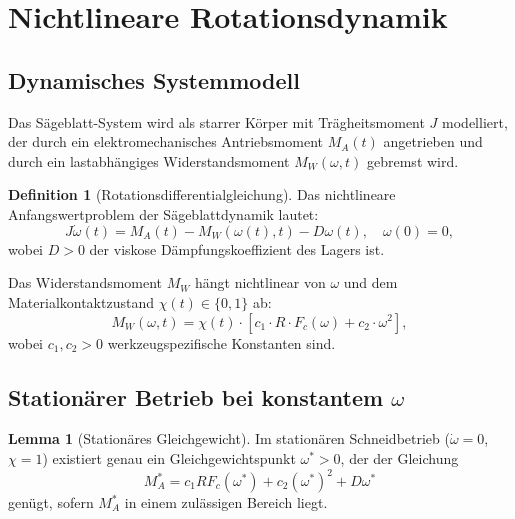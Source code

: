 ﻿\documentclass[a4paper,12pt]{article}
\theoremstyle{definition}
\newtheorem{definition}{Definition}
\newtheorem{lemma}{Lemma}
\begin{document}
\section{Nichtlineare Rotationsdynamik}
\label{sec:rotation}

\subsection{Dynamisches Systemmodell}

Das Sägeblatt-System wird als starrer Körper mit Trägheitsmoment $J$ modelliert,
der durch ein elektromechanisches Antriebsmoment $M_A(t)$ angetrieben und durch
ein lastabhängiges Widerstandsmoment $M_W(\omega, t)$ gebremst wird.

\begin{definition}[Rotationsdifferentialgleichung]
Das nichtlineare Anfangswertproblem der Sägeblattdynamik lautet:
\begin{equation}
\label{eq:rotation_dgl}
J \dot{\omega}(t) = M_A(t) - M_W(\omega(t), t) - D \omega(t), \quad \omega(0) = 0,
\end{equation}
wobei $D > 0$ der viskose Dämpfungskoeffizient des Lagers ist.
\end{definition}

Das Widerstandsmoment $M_W$ hängt nichtlinear von $\omega$ und dem
Materialkontaktzustand $\chi(t) \in \{0, 1\}$ ab:
\begin{equation}
\label{eq:widerstand}
M_W(\omega, t) = \chi(t) \cdot \left[ c_1 \cdot R \cdot F_c(\omega) + c_2 \cdot \omega^2 \right],
\end{equation}
wobei $c_1, c_2 > 0$ werkzeugspezifische Konstanten sind.

\subsection{Stationärer Betrieb bei konstantem $\omega$}

\begin{lemma}[Stationäres Gleichgewicht]
\label{lem:gleichgewicht}
Im stationären Schneidbetrieb ($\dot{\omega} = 0$, $\chi = 1$) existiert genau ein
Gleichgewichtspunkt $\omega^* > 0$, der der Gleichung
\[
M_A^* = c_1 R F_c(\omega^*) + c_2 (\omega^*)^2 + D\omega^*
\]
genügt, sofern $M_A^*$ in einem zulässigen Bereich liegt.
\end{lemma}
\end{document}
